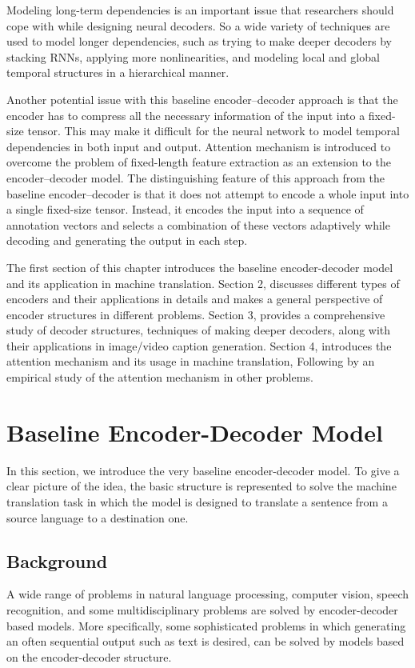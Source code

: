 \documentclass[preprint, 12pt]{elsarticle}
\begin{document}
	Modeling long-term dependencies is an important issue that researchers should cope with while designing neural decoders. So a wide variety of techniques are used to model longer dependencies, such as trying to make deeper decoders by stacking RNNs, applying more nonlinearities, and modeling local and global temporal structures in a hierarchical manner.
	
	Another potential issue with this baseline encoder–decoder approach is that the encoder has to compress all the necessary information of the input into a fixed-size tensor. This may make it difficult for the neural network to model temporal dependencies in both input and output. Attention mechanism is introduced to overcome the problem of fixed-length feature extraction as an extension to the encoder–decoder model. The distinguishing feature of this approach from the baseline encoder–decoder is that it does not attempt to encode a whole input into a single fixed-size tensor. Instead, it encodes the input into a sequence of annotation vectors and selects a combination of these vectors adaptively while decoding and generating the output in each step.
	
	The first section of this chapter introduces the baseline encoder-decoder model and its application in machine translation. Section 2, discusses different types of encoders and their applications in details and makes a general perspective of encoder structures in different problems. Section 3, provides a comprehensive study of decoder structures, techniques of making deeper decoders, along with their applications in image/video caption generation. Section 4, introduces the attention mechanism and its usage in machine translation, Following by an empirical study of the attention mechanism in other problems.
	
	\section{Baseline Encoder-Decoder Model}
	In this section, we introduce the very baseline encoder-decoder model. To give a clear picture of the idea, the basic structure is represented to solve the machine translation task in which the model is designed to translate a sentence from a source language to a destination one.  
		\subsection{Background}
		A wide range of problems in natural language processing, computer vision, speech recognition, and some multidisciplinary problems are solved by encoder-decoder based models. More specifically, some sophisticated problems in which generating an often sequential output such as text is desired, can be solved by models based on the encoder-decoder structure. 
		
\end{document}
